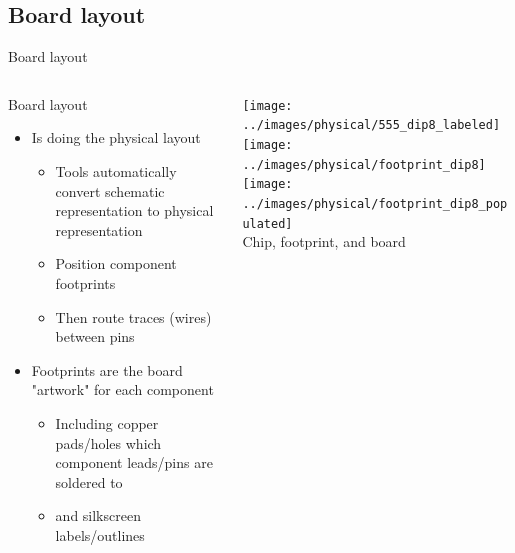 \documentclass{beamer}
\begin{document}
\subsection{Board layout}
\begin{frame}{Board layout}
  \begin{columns}[T]
    \begin{column}{.6\textwidth}
      Board layout
      \begin{itemize}
        \item Is doing the physical layout
        \begin{itemize}
          \item Tools automatically convert schematic representation to physical representation
          \item Position component footprints
          \item Then route traces (wires) between pins
        \end{itemize}
        \item Footprints are the board "artwork" for each component
        \begin{itemize}
          \item Including copper pads/holes which component leads/pins are soldered to
          \item and silkscreen labels/outlines
        \end{itemize}
      \end{itemize}
    \end{column}

    \begin{column}{0.4\textwidth} \centering
      \texttt{[image: ../images/physical/555\_dip8\_labeled]} \\
      \texttt{[image: ../images/physical/footprint\_dip8]}
      \texttt{[image: ../images/physical/footprint\_dip8\_populated]} \\
      Chip, footprint, and board
    \end{column}
  \end{columns}
\end{frame}
\end{document}
